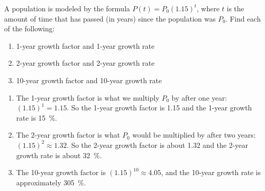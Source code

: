 \begin{pccexample}
	A population is modeled by the formula $P(t) = P_0(1.15)^t$, where $t$ is the amount 
	of time that has passed (in years) since the population 
	was $P_0$. Find each of the following:
	\begin{multicols}{3}
		\begin{enumerate}
			\item 1-year growth factor and 1-year growth rate
			\item 2-year growth factor and 2-year growth rate
			\item 10-year growth factor and 10-year growth rate
		\end{enumerate}
	\end{multicols}
	\begin{pccsolution}
		\begin{enumerate}
			\item The 1-year growth factor is what we multiply $P_0$ by after one year: $(1.15)^1=1.15$.  So the 1-year growth factor is 1.15 and the 1-year growth rate is \SI{15}{\percent}.
			\item The 2-year growth factor is what $P_0$ would be multiplied by after two years: $(1.15)^2\approx 1.32$.  So the 2-year growth factor is about 1.32 and the 2-year growth rate is about \SI{32}{\percent}.
			\item The 10-year growth factor is $(1.15)^{10}\approx 4.05$, and the 10-year growth rate is approximately \SI{305}{\percent}.
		\end{enumerate}
	\end{pccsolution}
\end{pccexample}

